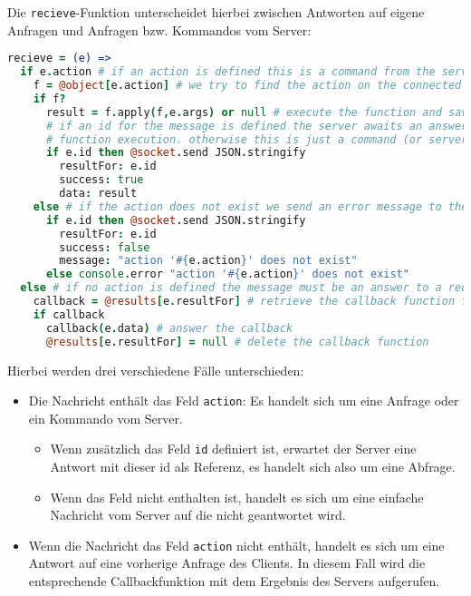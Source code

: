 Die \texttt{recieve}-Funktion unterscheidet hierbei zwischen Antworten auf eigene Anfragen und
Anfragen bzw. Kommandos vom Server:

\begin{lstlisting}[language=coffee]
recieve = (e) =>  
  if e.action # if an action is defined this is a command from the server
    f = @object[e.action] # we try to find the action on the connected object
    if f?
      result = f.apply(f,e.args) or null # execute the function and save the result
      # if an id for the message is defined the server awaits an answer with the result of the
      # function execution. otherwise this is just a command (or server-push)
      if e.id then @socket.send JSON.stringify 
        resultFor: e.id
        success: true
        data: result
    else # if the action does not exist we send an error message to the server
      if e.id then @socket.send JSON.stringify
        resultFor: e.id
        success: false
        message: "action '#{e.action}' does not exist"
      else console.error "action '#{e.action}' does not exist"
  else # if no action is defined the message must be an answer to a request
    callback = @results[e.resultFor] # retrieve the callback function for this action
    if callback 
      callback(e.data) # answer the callback
      @results[e.resultFor] = null # delete the callback function
\end{lstlisting}

Hierbei werden drei verschiedene Fälle unterschieden:

\begin{itemize}  
  \item Die Nachricht enthält das Feld \texttt{action}: Es handelt sich um eine
Anfrage oder ein Kommando vom Server.
  \begin{itemize}
    \item Wenn zusätzlich das Feld \texttt{id} definiert ist, erwartet der Server eine Antwort mit 
    dieser id als Referenz, es handelt sich also um eine Abfrage.
    \item Wenn das Feld nicht enthalten ist, handelt es sich um eine einfache Nachricht vom Server
    auf die nicht geantwortet wird.
  \end{itemize}
  \item Wenn die Nachricht das Feld \texttt{action} nicht enthält, handelt es sich um eine Antwort 
  auf eine vorherige Anfrage des Clients. In diesem Fall wird die entsprechende Callbackfunktion mit
  dem Ergebnis des Servers aufgerufen.
\end{itemize}

